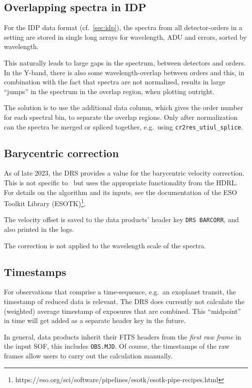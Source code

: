 \subsection{Overlapping spectra in IDP}

For the IDP data format (cf.~\ref{sec:idp}), the spectra from all
detector-orders in a setting are stored in single long arrays for wavelength,
ADU and errors, sorted by wavelength.

This naturally leads to large gaps in the spectrum, between detectors and
orders. In the Y-band, there is also some wavelength-overlap between orders and
this, in combination with the fact that spectra are not normalized, results in
large ``jumps'' in the spectrum in the overlap region, when plotting outright.

The solution is to use the additional data column, which gives the order number
for each spectral bin, to separate the overlap regions. Only after normalization
can the spectra be merged or spliced together, e.g.~using
\verb!cr2res_utiul_splice!.

\subsection{Barycentric correction}

As of late 2023, the DRS provides a value for the barycentric velocity
correction. This is not specific to \instrument\ but uses the appropriate
functionality from the HDRL. For details on the algorithm and its inputs,
see the documentation of the ESO Toolkit Library (ESOTK)\footnote{https://eso.org/sci/software/pipelines/esotk/esotk-pipe-recipes.html}.

The velocity offset is saved to the data products'
header key \verb!DRS BARCORR!, and also printed in the logs.

The correction is not applied to the wavelength scale of the spectra.


\subsection{Timestamps}
For observations that comprise a time-sequence, e.g.~an exoplanet transit,
the timestamp of reduced data is relevant. The DRS does currently not 
calculate the (weighted) average timestamp of exposures that are combined. This ``midpoint'' in time will get added as a separate header key in the future.

In general, data products inherit their FITS headers from the \emph{first raw frame} in the input SOF, this includes \texttt{OBS.MJD}. Of course, the timestamps of the raw frames allow users to carry out the calculation manually.